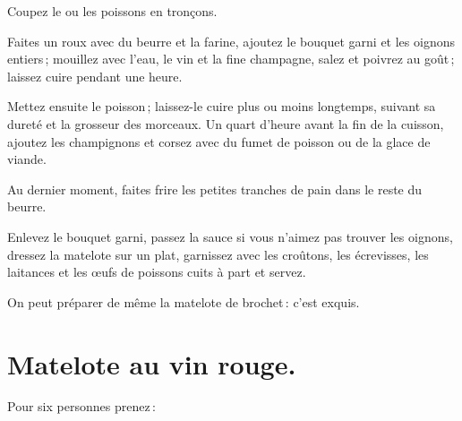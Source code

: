 Coupez le ou les poissons en tronçons.

Faites un roux avec du beurre et la farine, ajoutez le bouquet garni et les
oignons entiers ; mouillez avec l’eau, le vin et la fine champagne, salez et
poivrez au goût ; laissez cuire pendant une heure.

Mettez ensuite le poisson ; laissez-le cuire plus ou moins longtemps, suivant
sa dureté et la grosseur des morceaux. Un quart d'heure avant la fin de la
cuisson, ajoutez les champignons et corsez avec du fumet de poisson ou de la
glace de viande.

Au dernier moment, faites frire les petites tranches de pain dans le reste du
beurre.

Enlevez le bouquet garni, passez la sauce si vous n'aimez pas trouver les
oignons, dressez la matelote sur un plat, garnissez avec les croûtons, les
écrevisses, les laitances et les œufs de poissons cuits à part et servez.

\bigskip

\sk

\bigskip

On peut préparer de même la matelote de brochet : c'est exquis.

\section*{\centering Matelote au vin rouge.}

Pour six personnes prenez :

\medskip

